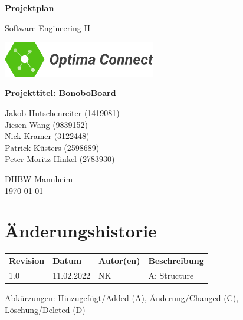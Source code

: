 \documentclass[a4paper,11pt]{scrartcl}
\begin{document}
\renewcommand*{\arraystretch}{1.2}
\begin{titlepage}
    \begin{center}
        \vspace*{1cm}\Huge
        \textbf{Projektplan}\par                
        \vspace{0.5cm}\LARGE        
        Software Engineering II\par           
        \vspace{2cm}
        \includegraphics[width=0.5\textwidth]{OptimaLogo_long}\par   
        \vspace{1cm}
        \textbf{Projekttitel: BonoboBoard}\par        
        \vfill\Large   
        Jakob Hutschenreiter (1419081)\\Jiesen Wang (9839152)\\Nick Kramer (3122448)\\Patrick Küsters (2598689)\\Peter Moritz Hinkel (2783930)\par
        \vspace{2cm}
        DHBW Mannheim\\
        \today     
    \end{center}
\end{titlepage}

\section*{Änderungshistorie}
\begin{table}[h]
	\begin{tabular}{@{} p{20mm} p{25mm} p{25mm} p{75mm}}
		\textbf{Revision} & \textbf{Datum} & \textbf{Autor(en)} & \textbf{Beschreibung}\\
		1.0 & 11.02.2022 & NK & A: Structure\\
	\end{tabular}
\end{table}
\noindent
Abkürzungen: Hinzugefügt/Added (A), Änderung/Changed (C), Löschung/Deleted (D)
\vspace{2cm}
\tableofcontents
\newpage
{}
\end{document}
